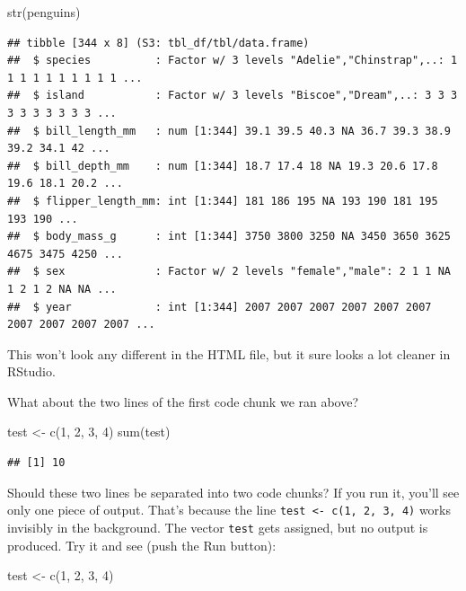 \documentclass[
]{book}
\newenvironment{Shaded}{\begin{snugshade}}{\end{snugshade}}
\newcommand{\DecValTok}[1]{\textcolor[rgb]{0.00,0.00,0.81}{#1}}
\newcommand{\FunctionTok}[1]{\textcolor[rgb]{0.00,0.00,0.00}{#1}}
\newcommand{\NormalTok}[1]{#1}
\newcommand{\OtherTok}[1]{\textcolor[rgb]{0.56,0.35,0.01}{#1}}
\begin{document}
\begin{Shaded}
\begin{Highlighting}[]
\FunctionTok{str}\NormalTok{(penguins)}
\end{Highlighting}
\end{Shaded}

\begin{verbatim}
## tibble [344 x 8] (S3: tbl_df/tbl/data.frame)
##  $ species          : Factor w/ 3 levels "Adelie","Chinstrap",..: 1 1 1 1 1 1 1 1 1 1 ...
##  $ island           : Factor w/ 3 levels "Biscoe","Dream",..: 3 3 3 3 3 3 3 3 3 3 ...
##  $ bill_length_mm   : num [1:344] 39.1 39.5 40.3 NA 36.7 39.3 38.9 39.2 34.1 42 ...
##  $ bill_depth_mm    : num [1:344] 18.7 17.4 18 NA 19.3 20.6 17.8 19.6 18.1 20.2 ...
##  $ flipper_length_mm: int [1:344] 181 186 195 NA 193 190 181 195 193 190 ...
##  $ body_mass_g      : int [1:344] 3750 3800 3250 NA 3450 3650 3625 4675 3475 4250 ...
##  $ sex              : Factor w/ 2 levels "female","male": 2 1 1 NA 1 2 1 2 NA NA ...
##  $ year             : int [1:344] 2007 2007 2007 2007 2007 2007 2007 2007 2007 2007 ...
\end{verbatim}

This won't look any different in the HTML file, but it sure looks a lot cleaner in RStudio.

What about the two lines of the first code chunk we ran above?

\begin{Shaded}
\begin{Highlighting}[]
\NormalTok{test }\OtherTok{\textless{}{-}} \FunctionTok{c}\NormalTok{(}\DecValTok{1}\NormalTok{, }\DecValTok{2}\NormalTok{, }\DecValTok{3}\NormalTok{, }\DecValTok{4}\NormalTok{)}
\FunctionTok{sum}\NormalTok{(test)}
\end{Highlighting}
\end{Shaded}

\begin{verbatim}
## [1] 10
\end{verbatim}

Should these two lines be separated into two code chunks? If you run it, you'll see only one piece of output. That's because the line \texttt{test\ \textless{}-\ c(1,\ 2,\ 3,\ 4)} works invisibly in the background. The vector \texttt{test} gets assigned, but no output is produced. Try it and see (push the Run button):

\begin{Shaded}
\begin{Highlighting}[]
\NormalTok{test }\OtherTok{\textless{}{-}} \FunctionTok{c}\NormalTok{(}\DecValTok{1}\NormalTok{, }\DecValTok{2}\NormalTok{, }\DecValTok{3}\NormalTok{, }\DecValTok{4}\NormalTok{)}
\end{Highlighting}
\end{Shaded}
\end{document}
